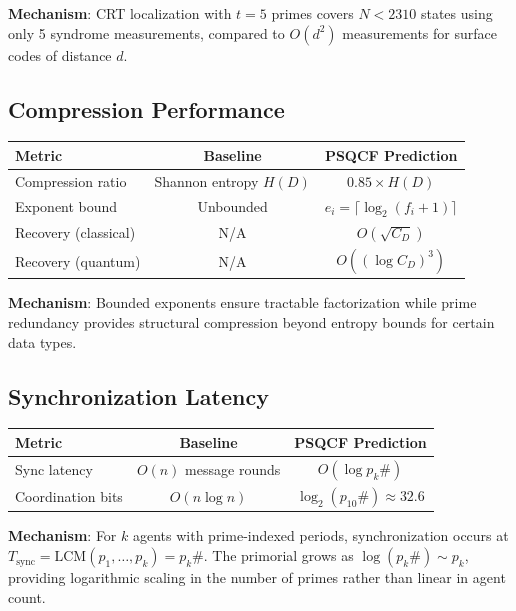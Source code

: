 \documentclass[12pt,a4paper]{article}
\begin{document}
\textbf{Mechanism}: CRT localization with $t=5$ primes covers $N < 2310$ states using only 5 syndrome measurements, compared to $O(d^2)$ measurements for surface codes of distance $d$.

\subsection{Compression Performance}

\begin{center}
\begin{tabular}{p{3.5cm}cc}
\toprule
\textbf{Metric} & \textbf{Baseline} & \textbf{PSQCF Prediction} \\
\midrule
Compression ratio & Shannon entropy $H(D)$ & $0.85 \times H(D)$ \\
Exponent bound & Unbounded & $e_i = \lceil \log_2(f_i+1) \rceil$ \\
Recovery (classical) & N/A & $O(\sqrt{C_D})$ \\
Recovery (quantum) & N/A & $O((\log C_D)^3)$ \\
\bottomrule
\end{tabular}
\end{center}

\textbf{Mechanism}: Bounded exponents ensure tractable factorization while prime redundancy provides structural compression beyond entropy bounds for certain data types.

\subsection{Synchronization Latency}

\begin{center}
\begin{tabular}{p{3.5cm}cc}
\toprule
\textbf{Metric} & \textbf{Baseline} & \textbf{PSQCF Prediction} \\
\midrule
Sync latency & $O(n)$ message rounds & $O(\log p_k\#)$ \\
Coordination bits & $O(n \log n)$ & $\log_2(p_{10}\#) \approx 32.6$ \\
\bottomrule
\end{tabular}
\end{center}

\textbf{Mechanism}: For $k$ agents with prime-indexed periods, synchronization occurs at $T_{\text{sync}} = \text{LCM}(p_1, \ldots, p_k) = p_k\#$. The primorial grows as $\log(p_k\#) \sim p_k$, providing logarithmic scaling in the number of primes rather than linear in agent count.
\end{document}

